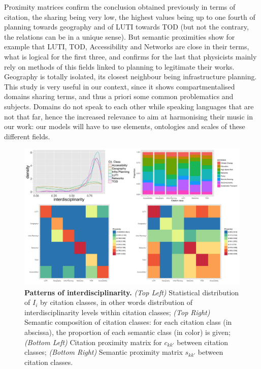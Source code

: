 \documentclass[10pt]{article}
\begin{document}
Proximity matrices confirm the conclusion obtained previously in terms of citation, the sharing being very low, the highest values being up to one fourth of planning towards geography and of LUTI towards TOD (but not the contrary, the relations can be in a unique sense). But semantic proximities show for example that LUTI, TOD, Accessibility and Networks are close in their terms, what is logical for the first three, and confirms for the last that physicists mainly rely on methods of this fields linked to planning to legitimate their works. Geography is totally isolated, its closest neighbour being infrastructure planning. This study is very useful in our context, since it shows compartmentalised domains sharing terms, and thus a priori some common problematics and subjects. Domains do not speak to each other while speaking languages that are not that far, hence the increased relevance to aim at harmonising their music in our work: our models will have to use elements, ontologies and scales of these different fields.


\begin{figure}
\includegraphics[width=\linewidth]{figures/2-2-2-fig-quantepistemo-interdisc.jpg}
\caption{\textbf{Patterns of interdisciplinarity.} \textit{(Top Left)} Statistical distribution of $I_i$ by citation classes, in other words distribution of interdisciplinarity levels within citation classes; \textit{(Top Right)} Semantic composition of citation classes: for each citation class (in abscissa), the proportion of each semantic class (in color) is given; \textit{(Bottom Left)} Citation proximity matrix for $c_{kk'}$ between citation classes; \textit{(Bottom Right)} Semantic proximity matrix $s_{kk'}$ between citation classes. \label{fig:interdisc}}
\end{figure}
\end{document}
